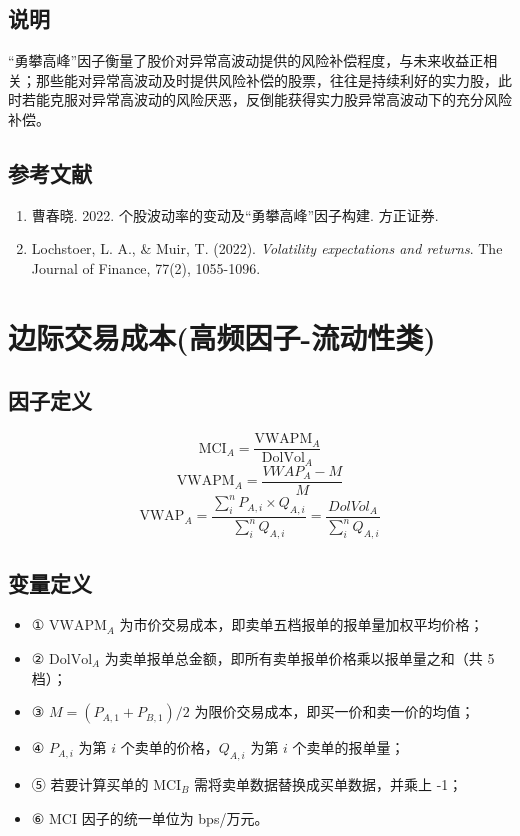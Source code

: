 \documentclass{article}
\begin{document}
\subsection{说明}
“勇攀高峰”因子衡量了股价对异常高波动提供的风险补偿程度，与未来收益正相关；那些能对异常高波动及时提供风险补偿的股票，往往是持续利好的实力股，此时若能克服对异常高波动的风险厌恶，反倒能获得实力股异常高波动下的充分风险补偿。

\subsection{参考文献}
\begin{enumerate}
    \item 曹春晓. 2022. 个股波动率的变动及“勇攀高峰”因子构建. 方正证券.
    \item Lochstoer, L. A., \& Muir, T. (2022). \textit{Volatility expectations and returns}. The Journal of Finance, 77(2), 1055-1096.
\end{enumerate}

\section{边际交易成本(高频因子-流动性类)}

\subsection{因子定义}

\begin{equation}
    \mathrm{MCI}_A = \frac{\mathrm{VWAPM}_A }{\mathrm{DolVol}_A}
\end{equation}
\begin{equation}
    \mathrm{VWAPM}_A = \frac{VWAP_A-M}{M}
\end{equation}
\begin{equation}
    \mathrm{VWAP}_A = \frac{\sum_i^nP_{A,i} \times Q_{A,i}}{\sum_i^nQ_{A,i}} = \frac{DolVol_A}{\sum_i^n Q_{A,i}}
\end{equation}

\subsection{变量定义}
\begin{itemize}
    \item ① \( \mathrm{VWAPM}_A \) 为市价交易成本，即卖单五档报单的报单量加权平均价格；
    \item ② \( \mathrm{DolVol}_A \) 为卖单报单总金额，即所有卖单报单价格乘以报单量之和（共 5 档）；
    \item ③ \( M = (P_{A,1} + P_{B,1})/2 \) 为限价交易成本，即买一价和卖一价的均值；
    \item ④ \( P_{A,i} \) 为第 \( i \) 个卖单的价格，\( Q_{A,i} \) 为第 \( i \) 个卖单的报单量；
    \item ⑤ 若要计算买单的 \( \mathrm{MCI}_B \) 需将卖单数据替换成买单数据，并乘上 -1；
    \item ⑥ MCI 因子的统一单位为 bps/万元。
\end{itemize}
\end{document}
